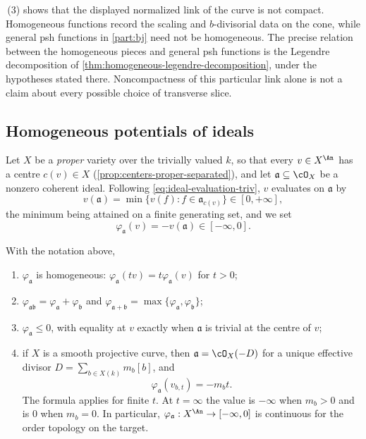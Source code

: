 \begin{remark}
\label{rem:ch08-homogeneous-cone}
\,(3) shows that the displayed
normalized link of the curve is not compact.  Homogeneous functions record
the scaling and $b$-divisorial data on the cone, while general psh functions
in \cref{part:bj} need not be homogeneous.  The precise relation between
the homogeneous pieces and general psh functions is the Legendre
decomposition of \cref{thm:homogeneous-legendre-decomposition}, under the
hypotheses stated there.  Noncompactness of this particular link alone is
not a claim about every possible choice of transverse slice.
\end{remark}

\subsection{Homogeneous potentials of ideals}
\label{sec:ch08-trivial-potentials}

Let $X$ be a \emph{proper} variety over the trivially valued $k$, so that
every $v\in X^{\An}$ has a centre $c(v)\in X$
(\cref{prop:centers-proper-separated}), and let
$\mathfrak a\subseteq\cO_X$ be a nonzero coherent ideal.  Following
\eqref{eq:ideal-evaluation-triv}, $v$ evaluates on
$\mathfrak a$ by
\[
 v(\mathfrak a)=\min\{v(f):f\in\mathfrak a_{c(v)}\}\in[0,+\infty] ,
\]
the minimum being attained on a finite generating set, and we set
\begin{equation}
\label{eq:ch08-ideal-potential}
 \varphi_{\mathfrak a}(v)=-v(\mathfrak a)\in[-\infty,0] .
\end{equation}

\begin{proposition}
\label{prop:ch08-ideal-potential}
With the notation above,
\begin{enumerate}
\item $\varphi_{\mathfrak a}$ is homogeneous:
$\varphi_{\mathfrak a}(tv)=t\varphi_{\mathfrak a}(v)$ for $t>0$;
\item $\varphi_{\mathfrak a\mathfrak b}
      =\varphi_{\mathfrak a}+\varphi_{\mathfrak b}$ and
      $\varphi_{\mathfrak a+\mathfrak b}
      =\max\{\varphi_{\mathfrak a},\varphi_{\mathfrak b}\}$;
\item $\varphi_{\mathfrak a}\leq0$, with equality at $v$ exactly when
$\mathfrak a$ is trivial at the centre of $v$;
\item if $X$ is a smooth projective curve, then
$\mathfrak a=\cO_X(-D)$ for a unique effective divisor
$D=\sum_{b\in X(k)}m_b[b]$, and
\[
                 \varphi_{\mathfrak a}(v_{b,t})=-m_bt .
\]
The formula applies for finite $t$.  At $t=\infty$ the value is
$-\infty$ when $m_b>0$ and is $0$ when $m_b=0$.
In particular, $\varphi_{\mathfrak a}:X^{\An}\to[-\infty,0]$ is continuous
for the order topology on the target.
\end{enumerate}
\end{proposition}

